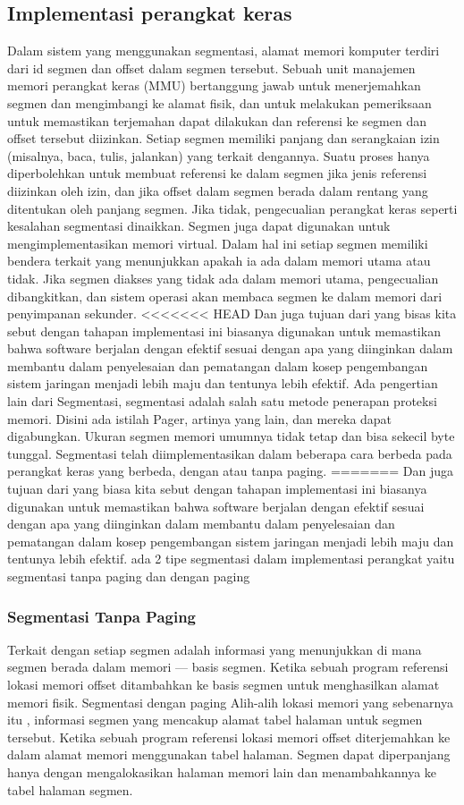 \subsection{Implementasi perangkat keras}
Dalam sistem yang menggunakan segmentasi, alamat memori komputer terdiri dari id segmen dan offset dalam segmen tersebut. Sebuah unit manajemen memori perangkat keras (MMU) bertanggung jawab untuk menerjemahkan segmen dan mengimbangi ke alamat fisik, dan untuk melakukan pemeriksaan untuk memastikan terjemahan dapat dilakukan dan referensi ke segmen dan offset tersebut diizinkan.
Setiap segmen memiliki panjang dan serangkaian izin (misalnya, baca, tulis, jalankan) yang terkait dengannya. Suatu proses hanya diperbolehkan untuk membuat referensi ke dalam segmen jika jenis referensi diizinkan oleh izin, dan jika offset dalam segmen berada dalam rentang yang ditentukan oleh panjang segmen. Jika tidak, pengecualian perangkat keras seperti kesalahan segmentasi dinaikkan.
Segmen juga dapat digunakan untuk mengimplementasikan memori virtual. Dalam hal ini setiap segmen memiliki bendera terkait yang menunjukkan apakah ia ada dalam memori utama atau tidak. Jika segmen diakses yang tidak ada dalam memori utama, pengecualian dibangkitkan, dan sistem operasi akan membaca segmen ke dalam memori dari penyimpanan sekunder.
<<<<<<< HEAD
Dan juga tujuan dari yang bisas kita sebut dengan tahapan implementasi ini biasanya digunakan untuk memastikan bahwa software berjalan dengan efektif sesuai dengan apa yang diinginkan dalam membantu dalam penyelesaian dan pematangan dalam kosep pengembangan sistem jaringan menjadi lebih maju dan tentunya lebih efektif.
Ada pengertian lain dari Segmentasi, segmentasi  adalah salah satu metode penerapan proteksi memori. Disini ada istilah  Pager, artinya yang lain, dan mereka dapat digabungkan. Ukuran segmen memori umumnya tidak tetap dan bisa sekecil byte tunggal. 
Segmentasi telah diimplementasikan dalam beberapa cara berbeda pada perangkat keras yang berbeda, dengan atau tanpa paging. 
=======
Dan juga tujuan dari yang biasa kita sebut dengan tahapan implementasi ini biasanya digunakan untuk memastikan bahwa software berjalan dengan efektif sesuai dengan apa yang diinginkan dalam membantu dalam penyelesaian dan pematangan dalam kosep pengembangan sistem jaringan menjadi lebih maju dan tentunya lebih efektif. ada 2 tipe segmentasi dalam implementasi perangkat yaitu segmentasi tanpa paging dan dengan paging
\subsubsection {Segmentasi Tanpa Paging}
Terkait dengan setiap segmen adalah informasi yang menunjukkan di mana segmen berada dalam memori — basis segmen. Ketika sebuah program referensi lokasi memori offset ditambahkan ke basis segmen untuk menghasilkan alamat memori fisik.
Segmentasi dengan paging
Alih-alih lokasi memori yang sebenarnya itu , informasi segmen yang mencakup alamat tabel halaman untuk segmen tersebut. Ketika sebuah program referensi lokasi memori offset diterjemahkan ke dalam alamat memori menggunakan tabel halaman. Segmen dapat diperpanjang hanya dengan mengalokasikan halaman memori lain dan menambahkannya ke tabel halaman segmen.

